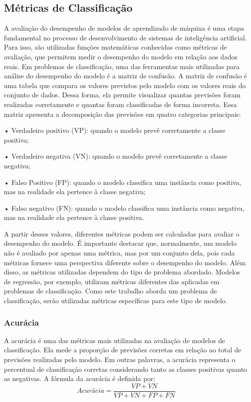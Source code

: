 \subsection{Métricas de Classificação}
A avaliação do desempenho de modelos de aprendizado de máquina é uma etapa
fundamental no processo de desenvolvimento de sistemas de inteligência artificial. Para isso,
são utilizadas funções matemáticas conhecidas como métricas de avaliação, que permitem
medir o desempenho do modelo em relação aos dados reais. Em problemas de classificação,
uma das ferramentas mais utilizadas para análise do desempenho do modelo é a matriz de
confusão. A matriz de confusão é uma tabela que compara os valores previstos pelo modelo
com os valores reais do conjunto de dados. Dessa forma, ela permite visualizar quantas
previsões foram realizadas corretamente e quantas foram classificadas de forma incorreta. Essa
matriz apresenta a decomposição das previsões em quatro categorias principais:

• Verdadeiro positivo (VP): quando o modelo prevê corretamente a classe
positiva;

• Verdadeiro negativa (VN): quando o modelo prevê corretamente a classe
negativa;

• Falso Positivo (FP): quando o modelo classifica uma instância como
positiva, mas na realidade ela pertence à classe negativa;

• Falso negativo (FN): quando o modelo classifica uma instância como
negativa, mas na realidade ela pertence à classe positiva.

A partir desses valores, diferentes métricas podem ser calculadas para avaliar o desempenho do
modelo. É importante destacar que, normalmente, um modelo não é avaliado por apenas uma
métrica, mas por um conjunto dela, pois cada métricas fornece uma perspectiva diferente sobre
o desempenho do modelo. Além disso, as métricas utilizadas dependem do tipo de problema abordado. Modelos de regressão, por exemplo, utilizam métricas diferentes das aplicadas em
problemas de classificação. Como este trabalho aborda um problema de classificação, serão
utilizadas métricas específicas para este tipo de modelo.


\subsubsection{Acurácia}
A acurácia é uma das métricas mais utilizadas na avaliação de modelos de classificação. Ela
mede a proporção de previsões corretas em relação ao total de previsões realizadas pelo modelo.
Em outras palavras, a acurácia representa o percentual de classificação corretas considerando
tanto as classes positivas quanto as negativas. A fórmula da acurácia é definida por:
\begin{equation}
    Acurácia = \frac{VP + VN}{VP + VN + FP + FN}
    \label{eq:40}
\end{equation}

